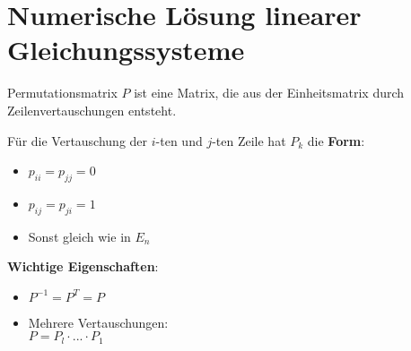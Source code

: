 \section{Numerische Lösung linearer Gleichungssysteme}

\begin{concept}{Permutationsmatrix} $P$ ist eine Matrix, die aus der Einheitsmatrix durch Zeilenvertauschungen entsteht. 
    \vspace{1mm}\\
    \begin{minipage}[t]{0.5\textwidth}
        Für die Vertauschung der $i$-ten und $j$-ten Zeile hat $P_k$ die \textbf{Form}:
        \begin{itemize}
            \item $p_{ii} = p_{jj} = 0$ 
            \item $p_{ij} = p_{ji} = 1$
            \item Sonst gleich wie in $E_n$
        \end{itemize}
    \end{minipage}
    \hspace{3mm}
    \begin{minipage}[t]{0.45\textwidth}
        \vspace{1mm}
        \textbf{Wichtige Eigenschaften}:
        \begin{itemize}
            \item $P^{-1} = P^T = P$
            \item Mehrere Vertauschungen:\\ $P = P_l \cdot ... \cdot P_1$
        \end{itemize}
    \end{minipage}
\end{concept}

